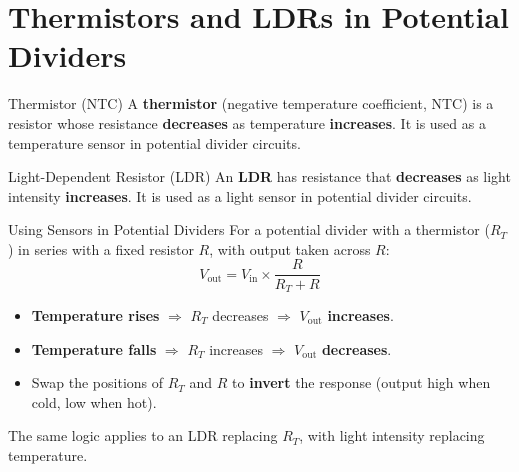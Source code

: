 \pagebreak

\section{Thermistors and LDRs in Potential Dividers}

\begin{definitionbox}{Thermistor (NTC)}
A \textbf{thermistor} (negative temperature coefficient, NTC) is a resistor whose resistance \textbf{decreases} as temperature \textbf{increases}. It is used as a temperature sensor in potential divider circuits.
\end{definitionbox}

\begin{definitionbox}{Light-Dependent Resistor (LDR)}
An \textbf{LDR} has resistance that \textbf{decreases} as light intensity \textbf{increases}. It is used as a light sensor in potential divider circuits.
\end{definitionbox}

\begin{keybox}{Using Sensors in Potential Dividers}
For a potential divider with a thermistor ($R_T$) in series with a fixed resistor $R$, with output taken across $R$:
$$V_{\text{out}} = V_{\text{in}} \times \frac{R}{R_T + R}$$
\begin{itemize}[itemsep=2pt]
  \item \textbf{Temperature rises} $\Rightarrow$ $R_T$ decreases $\Rightarrow$ $V_{\text{out}}$ \textbf{increases}.
  \item \textbf{Temperature falls} $\Rightarrow$ $R_T$ increases $\Rightarrow$ $V_{\text{out}}$ \textbf{decreases}.
  \item Swap the positions of $R_T$ and $R$ to \textbf{invert} the response (output high when cold, low when hot).
\end{itemize}
The same logic applies to an LDR replacing $R_T$, with light intensity replacing temperature.
\end{keybox}

\vspace{5em}

